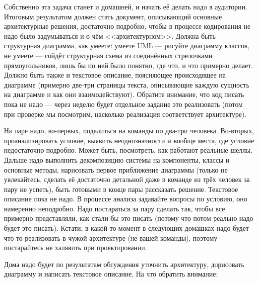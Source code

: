 \documentclass{../../text-style}
\begin{document}
Собственно эта задача станет и домашней, и начать её делать надо в аудитории. Итоговым результатом должен стать документ, описывающий основные архитектурные решения, достаточно подробно, чтобы в процессе кодирования не надо было задумываться и о чём <<архитектурном>>. Должна быть структурная диаграмма, как умеете: умеете UML --- рисуйте диаграмму классов, не умеете --- сойдёт структурная схема из соединённых стрелочками прямоугольников, лишь бы по ней было понятно, где что, и что примерно делает. Должно быть также и текстовое описание, поясняющее происходящее на диаграмме (примерно две-три страницы текста, описывающие каждую сущность на диаграмме и как они взаимодействуют). Обратите внимание, что код писать пока не надо --- через неделю будет отдельное задание это реализовать (потом при проверке мы посмотрим, насколько реализация соответствует архитектуре).

На паре надо, во-первых, поделиться на команды по два-три человека. Во-вторых, проанализировать условие, выявить неоднозначности и вообще места, где условие недостаточно подробно. Может быть, посмотреть, как работают реальные шеллы. Дальше надо выполнить декомпозицию системы на компоненты, классы и основные методы, нарисовать первое приближение диаграммы (только не увлекайтесь, сделать её достаточно детальной даже в команде из трёх человек за пару не успеть), быть готовыми в конце пары рассказать решение. Текстовое описание пока не надо. В процессе анализа задавайте вопросы по условию, оно намеренно неподробно. Надо постараться за пару сделать так, чтобы все примерно представляли, как стали бы это писать (потому что потом реально надо будет это писать). Кстати, в какой-то момент в следующих домашках надо будет что-то реализовать в чужой архитектуре (не вашей команды), поэтому постарайтесь не халявить при проектировании.

Дома надо будет по результатам обсуждения уточнить архитектуру, дорисовать диаграмму и написать текстовое описание. На что обратить внимание:
\end{document}
